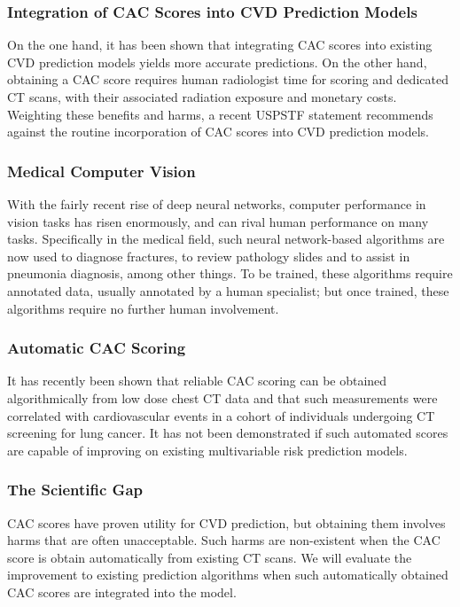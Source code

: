 \documentclass[a4paper,12pt]{article}
\begin{document}
			\subsubsection{Integration of CAC Scores into CVD Prediction Models}
			
			On the one hand, it has been shown that integrating CAC scores into existing CVD prediction models yields more accurate predictions\cite{Polonsky2010,Greenland2004}. On the other hand, obtaining a CAC score requires human radiologist time for scoring and dedicated CT scans, with their associated radiation exposure and monetary costs. Weighting these benefits and harms, a recent USPSTF statement recommends against the routine incorporation of CAC scores into CVD prediction models\cite{Force2018}.
			
			\subsubsection{Medical Computer Vision}
			
			With the fairly recent rise of deep neural networks, computer performance in vision tasks has risen enormously, and can rival human performance on many tasks. Specifically in the medical field, such neural network-based algorithms are now used to diagnose fractures\cite{Lindsey2018}, to review pathology slides\cite{EhteshamiBejnordi2018} and to assist in pneumonia diagnosis\cite{Abiyev2018}, among other things. To be trained, these algorithms require annotated data, usually annotated by a human specialist; but once trained, these algorithms require no further human involvement.
			
			\subsubsection{Automatic CAC Scoring}
			It has recently been shown that reliable CAC scoring can be obtained algorithmically from low dose chest CT data\cite{Isgum2012,Shadmi2018} and that such measurements were correlated with cardiovascular events in a cohort of individuals undergoing CT screening for lung cancer\cite{Takx2015a}. It has not been demonstrated if such automated scores are capable of improving on existing multivariable risk prediction models\cite{Force2018}.
			
			\subsubsection{The Scientific Gap}
			CAC scores have proven utility for CVD prediction, but obtaining them involves harms that are often unacceptable. Such harms are non-existent when the CAC score is obtain automatically from existing CT scans. We will evaluate the improvement to existing prediction algorithms when such automatically obtained CAC scores are integrated into the model.
			
\end{document}
